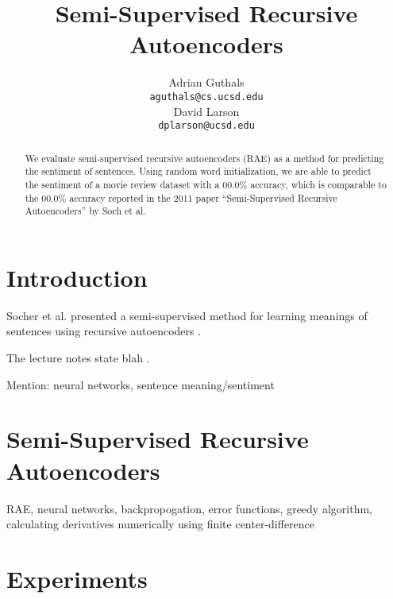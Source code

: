 \documentclass{article}
\title{Semi-Supervised Recursive Autoencoders}
\author{
Adrian Guthals \\
\texttt{aguthals@cs.ucsd.edu} \\
\And
David Larson \\
\texttt{dplarson@ucsd.edu} \\
}
\begin{document}
\maketitle


\begin{abstract}
We evaluate semi-supervised recursive autoencoders (RAE) as a method for predicting the sentiment of sentences. Using random word initialization, we are able to predict the sentiment of a movie review dataset with a 00.0\% accuracy, which is comparable to the 00.0\% accuracy reported in the 2011 paper ``Semi-Supervised Recursive Autoencoders'' by Soch et al.
\end{abstract}



\section{Introduction}

Socher et al. presented a semi-supervised method for learning meanings of sentences using recursive autoencoders \cite{Socher}.

The lecture notes state blah \cite{CSE250B}.

Mention: neural networks, sentence meaning/sentiment



\section{Semi-Supervised Recursive Autoencoders}
RAE, neural networks, backpropogation, error functions, greedy algorithm, calculating derivatives numerically using finite center-difference



\section{Experiments}

%
%
\end{document}
